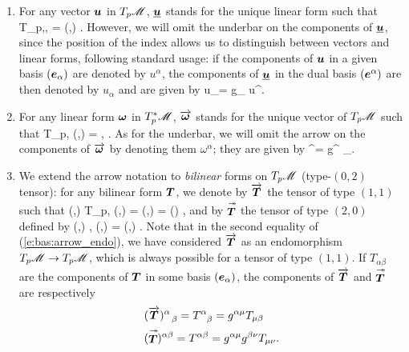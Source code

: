 \begin{enumerate}
\item For any vector $\bm{u}$ in $T_p\mathscr{M}$, $\underline{\bm{u}}$ stands for
the unique linear form such that
\be \label{e:bas:underbar}
    \forall {} \in T_p\M,\quad \langle {}, 
        \rangle = (,) .
\ee
However, we will omit the underbar on the components
of $\underline{\bm{u}}$, since
the position of the index allows us to distinguish between vectors
and  linear forms, following standard usage:
if the components of
$\bm{u}$ in a given basis $(\bm{e}_\alpha)$ are denoted by $u^\alpha$,
the components of $\underline{\bm{u}}$ in the dual basis $(\bm{e}^\alpha)$
are then denoted by $u_\alpha$ and are given by
\be \label{e:bas:u_dual}
  u_\alpha = g_{\alpha\mu} u^\mu .
\ee
\item For any linear form $\bm{\omega}$ in ${T_p^*\mathscr{M}}$, $\overrightarrow{\bm{\bm{\omega}}}$
stands for the unique vector of $T_p\mathscr{M}$ such that
\be \label{e:bas:arrow_form}
    \forall {} \in T_p\M,\quad
        (\vw{\w{\omega}},) =
        \langle \w{\omega},  \rangle .
\ee
As for the underbar, we will omit the arrow on the components
of $\overrightarrow{\bm{\bm{\omega}}}$ by denoting them $\omega^\alpha$; they are given by
\be \label{e:bas:arrow_form_comp}
  \omega^\alpha = g^{\alpha\mu} \omega_\mu .
\ee
\item We extend the arrow notation to {\em bilinear} forms on $T_p\mathscr{M}$ (type-$(0,2)$ tensor):
for any bilinear form $\bm{T}$,
we denote by $\overrightarrow{\bm{T}}$ the tensor of type $(1,1)$ such that
\be \label{e:bas:arrow_endo}
    \forall (,) \in T_p\M{}, \quad
    (,) = (,) =  \cdot {}() ,
\ee
and by $\stackrel{\twoheadrightarrow}{\bm{T}}$ the tensor of type $(2,0)$ defined by
\be \label{e:bas:arrow_double}
    \forall (,) , \quad
    (,) = (,) .
\ee
Note that in the second equality of (\ref{e:bas:arrow_endo}), we have considered $\overrightarrow{\bm{T}}$
as an endomorphism ${T_p\mathscr{M}}\rightarrow {T_p\mathscr{M}}$, which is always possible for a tensor of
type $(1,1)$.
If $T_{\alpha\beta}$ are the components of $\bm{T}$
in some basis $(\bm{e}_\alpha)$, the components of $\overrightarrow{\bm{T}}$ and $\stackrel{\twoheadrightarrow}{\bm{T}}$ are respectively
\begin{subequations}
\begin{align}
  & (\overrightarrow{\bm{T}})^\alpha_{\ \  \beta} = T^\alpha_{\ \  \beta} = g^{\alpha\mu} T_{\mu\beta}
    \label{e:bas:arrow_endo_index}\\
  & (\stackrel{\twoheadrightarrow}{\bm{T}})^{\alpha\beta} = T^{\alpha\beta} = g^{\alpha\mu} g^{\beta\nu} T_{\mu\nu} .
    \label{e:bas:arrow_double_index}
\end{align}
\end{subequations}
\end{enumerate}

